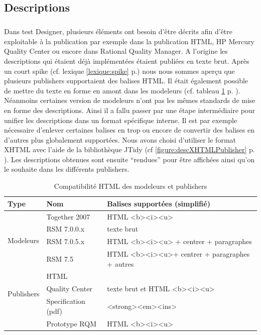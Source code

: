 \subsection{Descriptions}
\subparagraph*{}
Dans test Designer, plusieurs éléments ont besoin d'être décrits afin d'être exploitable à la publication par exemple dans la publication HTML, HP Mercury Quality Center ou encore dans Rational Quality Manager. A l'origine les descriptions qui étaient déjà implémentées étaient publiées en texte brut. Après un court spike (cf. lexique \ref{lexique:spike} p.\pageref{lexique:spike}) nous nous sommes aperçu que plusieurs publishers supportaient des balises HTML. Il était également possible de mettre du texte en forme en amont dans les modeleurs (cf. tableau \ref{tableau:compatDescHTML} p. \pageref{tableau:compatDescHTML}). Néanmoins certaines version de modeleurs n'ont pas les mêmes standards de mise en forme des descriptions. Ainsi il a fallu passer par une étape intermédiaire pour unifier les descriptions dans un format spécifique interne. Il est par exemple nécessaire d'enlever certaines balises en trop ou encore de convertir des balises en d'autres plus globalement supportées. Nous avons choisi d'utiliser le format XHTML avec l'aide de la bibliothèque JTidy (cf \ref{figure:descXHTMLPublisher} p. \pageref{figure:descXHTMLPublisher}). Les descriptions obtenues sont ensuite ``rendues'' pour être affichées ainsi qu'on le souhaite dans les différents publishers.
\begin{table}[!ht]
\caption{\label{tableau:compatDescHTML}Compatibilité HTML des modeleurs et publishers}
\begin{tabular}{|l|l|l|}
\hline
Type & Nom & Balises supportées (simplifié) \\
\hline
\hline
\multirow{4}{*}{Modeleurs} & Together 2007 & HTML <b><i><u> \\
& RSM 7.0.0.x & texte brut\\
& RSM 7.0.5.x & HTML <b><i><u> + centrer + paragraphes\\ 
& RSM 7.5 & HTML <b><i><u>+ centrer + paragraphes + autres\\ \hline
\multirow{3}{*}{Publishers} & HTML & \\
& Quality Center & texte brut et HTML <b><i><u> \\
& Specification (pdf) & <strong><em><ins> \\
& Prototype RQM & HTML <b><i><u> \\ \hline
\end{tabular}
\end{table}
